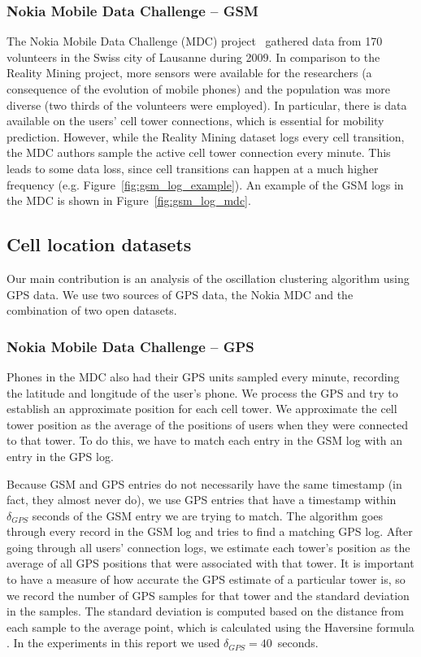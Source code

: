 \documentclass[letterpaper, 12pt, conference]{ieeeconf}
\begin{document}
\subsubsection{Nokia Mobile Data Challenge -- GSM}

The Nokia Mobile Data Challenge (MDC) project~\cite{nokiaMdc} gathered data 
from 170 volunteers in the Swiss city of Lausanne during 2009. In comparison 
to the Reality Mining project, more sensors were available for the 
researchers (a consequence of the evolution of mobile phones) and the 
population was more diverse (two thirds of the volunteers were employed). In 
particular, there is data available on the users' cell tower connections, 
which is essential for mobility prediction. However, while the Reality Mining 
dataset logs every cell transition, the MDC authors sample the active cell 
tower connection every minute. This leads to some data loss, since cell 
transitions can happen at a much higher frequency (e.g.
Figure~\ref{fig:gsm_log_example}). An example of the GSM logs in the MDC is shown in
Figure~\ref{fig:gsm_log_mdc}.

\subsection{Cell location datasets}

Our main contribution is an analysis of the oscillation clustering algorithm 
using GPS data. We use two sources of GPS data, the Nokia MDC and the combination of two open datasets.

\subsubsection{Nokia Mobile Data Challenge -- GPS}

Phones in the MDC also had their GPS units sampled every minute, recording 
the latitude and longitude of the user's phone. We process the GPS and try to 
establish an approximate position for each cell tower. We approximate the 
cell tower position as the average of the positions of users when they were 
connected to that tower. To do this, we have to match each entry in the GSM 
log with an entry in the GPS log.

Because GSM and GPS entries do not necessarily have the same timestamp (in 
fact, they almost never do), we use GPS entries that have a timestamp within $
\delta_{GPS}$ seconds of the GSM entry we are trying to match. The algorithm 
goes through every record in the GSM log and tries to find a matching GPS 
log. After going through all users' connection logs, we estimate each tower's 
position as the average of all GPS positions that were associated with that 
tower. It is important to have a measure of how accurate the GPS estimate of 
a particular tower is, so we record the number of GPS samples for that tower 
and the standard deviation in the samples. The standard deviation is computed 
based on the distance from each sample to the average point, which is 
calculated using the Haversine formula \cite{haversine}. In the experiments in this
report we used $\delta_{GPS}=40$~seconds.
\end{document}
